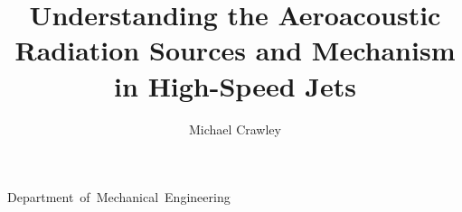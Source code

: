 \documentclass{osudissert96}
\begin{document}
%
%

\author{Michael Crawley}
\title{Understanding the Aeroacoustic Radiation Sources and Mechanism in High-Speed Jets}
\unit{Department of Mechanical Engineering}



%
%

\maketitle
\disscopyright


%
%

\begin{abstract}
  
\end{abstract}

\dedication{This work is dedicated to Science \ldots}


%
%





%
%

\tableofcontents
\listoftables
\listoffigures


%
%



%
%

\appendix
%
%


%
%



\end{document}
